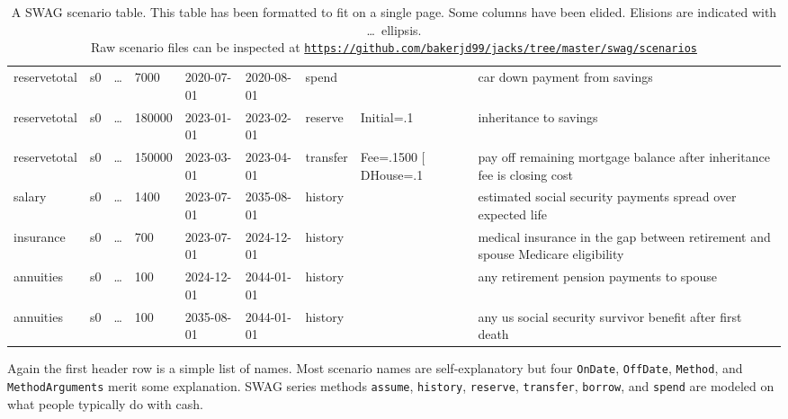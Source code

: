 \begin{sidewaystable}
\begin{tabular}{llllllllp{1.5in}}
reservetotal &s0 &\ldots &7000   &2020-07-01 &2020-08-01 &spend    &                                                               &car down payment from savings \\                                                  
reservetotal &s0 &\ldots &180000 &2023-01-01 &2023-02-01 &reserve  &Initial=.1                                                     &inheritance to savings \\                                                         
reservetotal &s0 &\ldots &150000 &2023-03-01 &2023-04-01 &transfer &Fee=.1500 [ DHouse=.1                                         &pay off remaining mortgage balance after inheritance fee is closing cost \\       
salary       &s0 &\ldots &1400   &2023-07-01 &2035-08-01 &history  &                                                               &estimated social security payments spread over expected life  \\                  
insurance    &s0 &\ldots &700    &2023-07-01 &2024-12-01 &history  &                                                               &medical insurance in the gap between retirement and spouse Medicare eligibility \\
annuities    &s0 &\ldots &100    &2024-12-01 &2044-01-01 &history  &                                                               &any retirement pension payments to spouse \\                                       
annuities    &s0 &\ldots &100    &2035-08-01 &2044-01-01 &history  &                                                               &any us social security survivor benefit after first death \\ \hline
\end{tabular}
\normalsize
\caption{A SWAG scenario table. This table has been formatted to fit on a single page. Some columns 
have been elided. Elisions are indicated with \ldots\ ellipsis.
\vspace{5pt}
\\
Raw scenario files can be inspected at \href{https://github.com/bakerjd99/jacks/tree/master/swag/scenarios}{\texttt{https://github.com/bakerjd99/jacks/tree/master/swag/scenarios}}}
\label{tab:5175x2}
\end{sidewaystable}


Again the first header row is a simple list of names. Most scenario
names are self-explanatory but four \texttt{OnDate}, \texttt{OffDate},
\texttt{Method}, and \texttt{MethodArguments} merit some explanation.
SWAG series methods \texttt{assume}, \texttt{history}, \texttt{reserve},
\texttt{transfer}, \texttt{borrow}, and \texttt{spend} are modeled on
what people typically do with cash.

